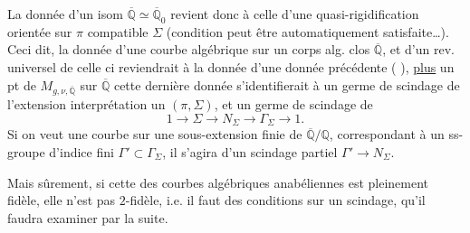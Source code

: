 La donnée d'un isom $\overline{\mathbb Q}\simeq\overline{\mathbb Q}_0$ revient donc à celle d'une quasi-rigidification orientée sur $\pi$ compatible  $\Sigma$ (condition peut être automatiquement satisfaite\ldots).
Ceci dit, la donnée d'une courbe algébrique  sur   un corps alg. clos $\overline{\mathbb Q}$, et d'un rev. universel  de celle ci reviendrait à la donnée d'une donnée précédente ( ), \uline{plus} un pt de $M_{g,\nu,\overline{\mathbb Q}}$ sur $\overline{\mathbb Q}$   cette dernière donnée s'identifierait à un  germe de scindage de l'extension
interprétation     un $(\pi,\Sigma)$, et un germe de scindage de
\[
1\longrightarrow\Sigma\longrightarrow N_\Sigma\longrightarrow\Gamma_\Sigma\longrightarrow1.
\]
Si on veut une courbe sur une sous-extension finie  de $\overline{\mathbb Q}/\mathbb Q$, correspondant à un ss-groupe d'indice fini $\Gamma'\subset\Gamma_\Sigma$, il s'agira d'un scindage  partiel $\Gamma'\longrightarrow N_\Sigma$.

Mais sûrement, si cette   des courbes algébriques anabéliennes est pleinement fidèle, elle n'est pas $2$-fidèle, i.e. il faut des conditions sur un scindage, qu'il faudra examiner par la suite.

